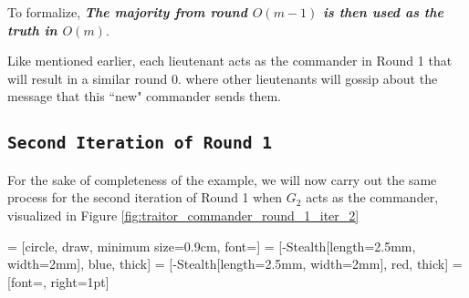 \documentclass[11pt]{article}
\newcommand{\gen}[1]{\ensuremath{G_{#1}}}
\begin{document}
\vspace{1em}
To formalize, \textbf{\textit{The majority from round $O(m-1)$ is then used as the truth in $O(m)$}}.
\vspace{1em}

Like mentioned earlier, each lieutenant acts as the commander in Round 1 that will result in a similar round 0. where other lieutenants will gossip about the message that this ``new" commander sends them.

\subsection*{\texttt{\large Second Iteration of Round 1}}
For the sake of completeness of the example, we will now carry out the same process for the second iteration of Round 1 when $\gen{2}$ acts as the commander, visualized in Figure \ref{fig:traitor_commander_round_1_iter_2}

 = [circle, draw, minimum size=0.9cm, font=\small]
 = [-{Stealth[length=2.5mm, width=2mm]}, blue, thick] %
 = [-{Stealth[length=2.5mm, width=2mm]}, red, thick]  %
 = [font=\scriptsize, right=1pt]
\end{document}
